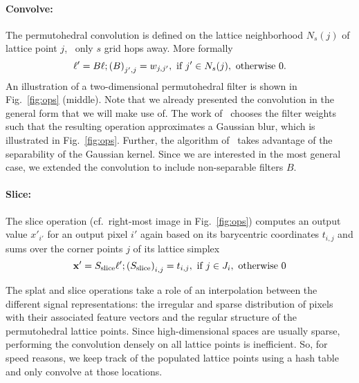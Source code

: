 \paragraph{Convolve:} The permutohedral convolution is defined on the
lattice neighborhood $N_s(j)$ of lattice point $j$, \eg\ only $s$ grid hops away. More formally
\vspace{-0.7em}
\begin{equation}
  \label{eq:blur}
  \mathbf{\ell'} = B \mathbf{\ell}; {(B)}_{j', j} =  w_{j, j'},%
  \text{ if } j' \in N_s(j), \text{ otherwise } 0.
\vspace{-0.5em}
\end{equation}
An illustration of a two-dimensional permutohedral filter is shown in Fig.~\ref{fig:ops} (middle).
Note that we already presented the convolution in the general form that we will make
use of. The work of~\cite{adams2010fast} chooses the filter weights such that
the resulting operation approximates a Gaussian blur, which is illustrated in Fig.~\ref{fig:ops}.
Further, the algorithm of~\cite{adams2010fast} takes advantage of the
separability of the Gaussian kernel. Since we are interested in the most general case, we
extended the convolution to include non-separable filters $B$.

\vspace{-0.3cm}
\paragraph{Slice:} The slice operation (cf.\ right-most image in
Fig.~\ref{fig:ops}) computes an output value $x'_{i'}$ for an output pixel $i'$
again based on its barycentric coordinates $t_{i, j}$ and sums over the corner
points $j$ of its lattice simplex
\vspace{-0.7em}
\begin{equation}
  \label{eq:slice}
  \bv' = S_{\text{slice}} \mathbf{\ell'}; %
  {(S_{\text{slice}})}_{i, j} = t_{i, j}, \text{ if } j\in J_i, \text{ otherwise } 0
\vspace{-0.5em}
\end{equation}

The splat and slice operations take a role of an interpolation between the
different signal representations: the irregular and sparse distribution of
pixels with their associated feature vectors and the regular structure of the
permutohedral lattice points. Since high-dimensional spaces are usually sparse,
performing the convolution densely on all lattice points is inefficient. So, for
speed reasons, we keep track of the populated lattice points using a hash table
and only convolve at those locations.

